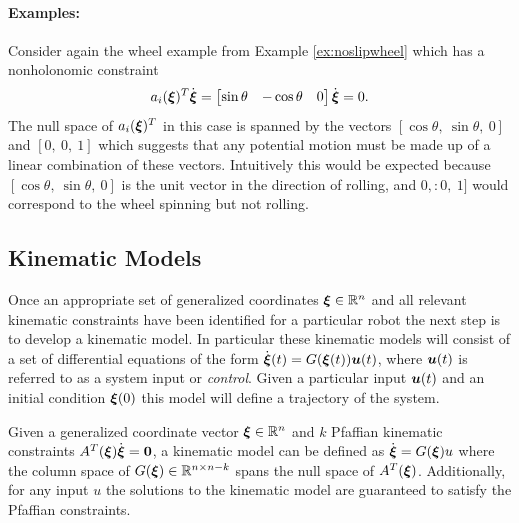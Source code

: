 \paragraph{Examples:}
Consider again the wheel example from Example \ref{ex:noslipwheel} which has a nonholonomic constraint
\begin{equation*}
a_i(\bm{\xi})^T\dot{\bm{\xi}} = \begin{bmatrix}
\sin \theta & -\cos \theta & 0
\end{bmatrix}\dot{\bm{\xi}}=0.
\end{equation*}
The null space of $a_i(\bm{\xi})^T$ in this case is spanned by the vectors $[\cos \theta, \: \sin \theta,\: 0]$ and $[0, \: 0,\: 1]$ which suggests that any potential motion must be made up of a linear combination of these vectors. Intuitively this would be expected because $[\cos \theta, \: \sin \theta,\: 0]$ is the unit vector in the direction of rolling, and $0, : 0,\: 1]$ would correspond to the wheel spinning but not rolling. 

\subsection{Kinematic Models}
Once an appropriate set of generalized coordinates $\bm{\xi} \in \mathbb{R}^n$ and all relevant kinematic constraints have been identified for a particular robot the next step is to develop a kinematic model.
In particular these kinematic models will consist of a set of differential equations of the form $\dot{\bm{\xi}}(t) = G(\bm{\xi}(t))\bm{u}(t)$, where $\bm{u}(t)$ is referred to as a system input or \textit{control}. Given a particular input $\bm{u}(t)$ and an initial condition $\bm{\xi}(0)$ this model will define a trajectory of the system.

\begin{definition} 
Given a generalized coordinate vector $\bm{\xi} \in \mathbb{R}^n$ and $k$ Pfaffian kinematic constraints $A^T(\bm{\xi})\dot{\bm{\xi}}=\bm{0}$, a kinematic model can be defined as $\dot{\bm{\xi}} = G(\bm{\xi})u$ where the column space of $G(\bm{\xi}) \in \mathbb{R}^{n \times n-k}$ spans the null space of $A^T(\bm{\xi})$. Additionally, for any input $u$ the solutions to the kinematic model are guaranteed to satisfy the Pfaffian constraints.
\end{definition}

